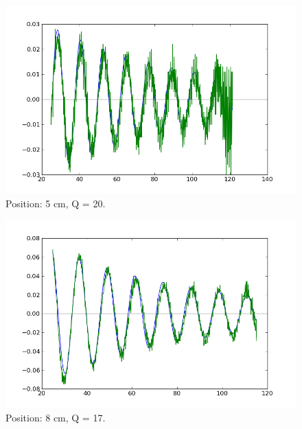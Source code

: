 \documentclass[12pt]{article}
\begin{document}
\begin{figure}[H]
\centering
\hspace{-0.0in}\includegraphics[scale=0.60]{SeisPosition3.png}
\caption{Position: 5 cm, Q = 20. \label{fig:setup}}
\end{figure}

\begin{figure}[H]
\centering
\hspace{-0.0in}\includegraphics[scale=0.60]{SeisPosition4.png}
\caption{Position: 8 cm, Q = 17. \label{fig:setup}}
\end{figure}
\end{document}
